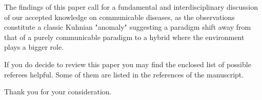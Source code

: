 \documentclass[11pt,a4paper,roman]{moderncv}
\begin{document}
The findings of this paper call for a fundamental and interdisciplinary discussion of our accepted knowledge on communicable diseases, as the observations constitute a classic Kuhnian "anomaly" suggesting a paradigm shift away from that of a purely communicable paradigm to a hybrid where the environment plays a bigger role.

If you do decide to review this paper you may find the enclosed list of possible referees helpful. 
Some of them are listed in the references of the manuscript. 

Thank you for your consideration.

\makeletterclosing
\newpage


\end{document}
